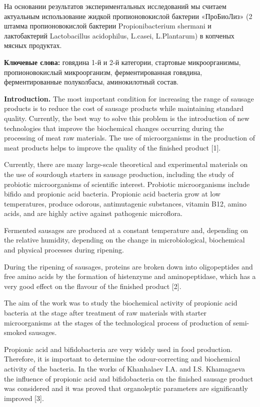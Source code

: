На основании результатов экспериментальных исследований мы считаем
актуальным использование жидкой пропионовокислой бактерии «ПроБиоЛиз» (2
штамма пропионовокислой бактерии Propionibacterium shermani и
лактобактерий Lactobacillus acidophilus, L.casei, L.Plantarum) в
копченых мясных продуктах.

{\bfseries Ключевые слова:} говядина 1-й и 2-й категории, стартовые
микроорганизмы, пропионовокислый микроорганизм, ферментированная
говядина, ферментированные полуколбасы, аминокилотный состав.

{\bfseries Introduction.} The most important condition for increasing the
range of sausage products is to reduce the cost of sausage products
while maintaining standard quality. Currently, the best way to solve
this problem is the introduction of new technologies that improve the
biochemical changes occurring during the processing of meat raw
materials. The use of microorganisms in the production of meat products
helps to improve the quality of the finished product {[}1{]}.

Currently, there are many large-scale theoretical and experimental
materials on the use of sourdough starters in sausage production,
including the study of probiotic microorganisms of scientific interest.
Probiotic microorganisms include bifido and propionic acid bacteria.
Propionic acid bacteria grow at low temperatures, produce odorous,
antimutagenic substances, vitamin B12, amino acids, and are highly
active against pathogenic microflora.

Fermented sausages are produced at a constant temperature and, depending
on the relative humidity, depending on the change in microbiological,
biochemical and physical processes during ripening.

During the ripening of sausages, proteins are broken down into
oligopeptides and free amino acids by the formation of histenzyme and
aminopeptidase, which has a very good effect on the flavour of the
finished product {[}2{]}.

The aim of the work was to study the biochemical activity of propionic
acid bacteria at the stage after treatment of raw materials with starter
microorganisms at the stages of the technological process of production
of semi-smoked sausages.

Propionic acid and bifidobacteria are very widely used in food
production. Therefore, it is important to determine the odour-correcting
and biochemical activity of the bacteria. In the works of Khanhalaev
I.A. and I.S. Khamagaeva the influence of propionic acid and
bifidobacteria on the finished sausage product was considered and it was
proved that organoleptic parameters are significantly improved {[}3{]}.

